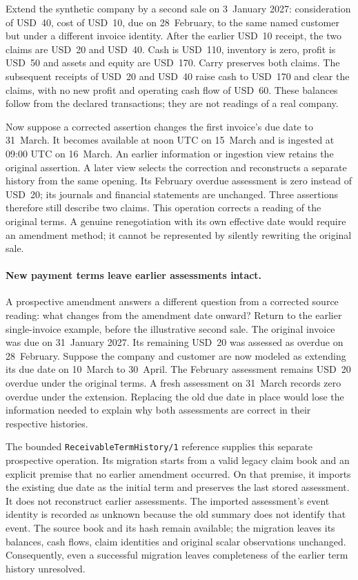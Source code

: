 Extend the synthetic company by a second sale on 3~January 2027: consideration
of USD~40, cost of USD~10, due on 28~February, to the same named customer but
under a different invoice identity. After the earlier USD~10 receipt, the two
claims are USD~20 and USD~40. Cash is USD~110, inventory is zero, profit is
USD~50 and assets and equity are USD~170. Carry preserves both claims. The
subsequent receipts of USD~20 and USD~40 raise cash to USD~170 and clear the
claims, with no new profit and operating cash flow of USD~60. These balances
follow from the declared transactions; they are not readings of a real company.

Now suppose a corrected assertion changes the first invoice's due date to
31~March. It becomes available at noon UTC on 15~March and is ingested at
09:00 UTC on 16~March. An earlier information or ingestion view retains the
original assertion. A later view selects the correction and reconstructs a
separate history from the same opening. Its February overdue assessment is
zero instead of USD~20; its journals and financial statements are unchanged.
Three assertions therefore still describe two claims. This operation corrects
a reading of the original terms. A genuine renegotiation with its own effective
date would require an amendment method; it cannot be represented by silently
rewriting the original sale.

\paragraph{New payment terms leave earlier assessments intact.}
A prospective amendment answers a different question from a corrected source
reading: what changes from the amendment date onward? Return to the earlier
single-invoice example, before the illustrative second sale. The original
invoice was due on 31~January 2027. Its remaining USD~20 was assessed as
overdue on 28~February. Suppose the company and customer are now modeled as
extending its due date on 10~March to 30~April. The February assessment remains
USD~20 overdue under the original terms. A fresh assessment on 31~March records
zero overdue under the extension. Replacing the old due date in place would
lose the information needed to explain why both assessments are correct in
their respective histories.

The bounded \texttt{ReceivableTermHistory/1} reference supplies this separate
prospective operation. Its migration starts from a valid legacy claim book
and an explicit premise that no earlier amendment occurred. On that premise,
it imports the existing due date as the initial term and preserves the last
stored assessment. It does not reconstruct earlier assessments. The imported
assessment's event identity is recorded as unknown because the old summary
does not identify that event. The source book and its hash remain available;
the migration leaves its balances, cash flows, claim identities and original
scalar observations unchanged. Consequently, even a successful migration
leaves completeness of the earlier term history unresolved.

